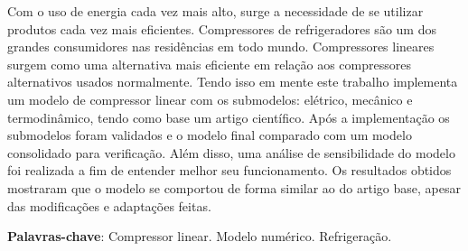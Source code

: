

	



\setlength{\absparsep}{18pt} %
\begin{resumo}
	\SingleSpacing
    Com o uso de energia cada vez mais alto, surge a necessidade de se utilizar produtos cada vez mais eficientes. Compressores de refrigeradores são um dos grandes consumidores nas residências em todo mundo. Compressores lineares surgem como uma alternativa mais eficiente em relação aos compressores alternativos usados normalmente. Tendo isso em mente este trabalho implementa um modelo de compressor linear com os submodelos: elétrico, mecânico e termodinâmico, tendo como base um artigo científico. Após a implementação os submodelos foram validados e o modelo final comparado com um modelo consolidado para verificação. Além disso, uma análise de sensibilidade do modelo foi realizada a fim de entender melhor seu funcionamento. Os resultados obtidos mostraram que o modelo se comportou de forma similar ao do artigo base, apesar das modificações e adaptações feitas.
	
	\textbf{Palavras-chave}: Compressor linear. Modelo numérico. Refrigeração.
\end{resumo}

